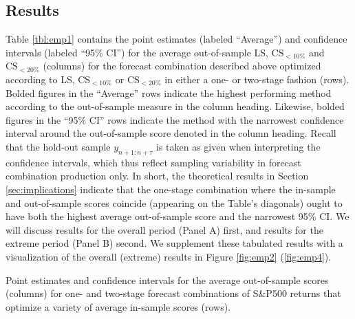 \documentclass[12pt]{article}
\theoremstyle{definition}
\theoremstyle{remark}
\begin{document}
\subsection{Results \label{subsec:empresults}}

Table \ref{tbl:emp1} contains the point estimates (labeled ``Average'') and confidence intervals (labeled ``95\% CI'') for the average out-of-sample LS, $\mathrm{CS}_{<10\%}$ and $\mathrm{CS}_{<20\%}$ (columns) for the forecast combination described above optimized according to LS, $\mathrm{CS}_{<10\%}$ or $\mathrm{CS}_{<20\%}$ in either a one- or two-stage fashion (rows). Bolded figures in the ``Average'' rows indicate the highest performing method according to the out-of-sample measure in the column heading. Likewise, bolded figures in the ``95\% CI'' rows indicate the method with the narrowest confidence interval around the out-of-sample score denoted in the column heading. Recall that the hold-out sample $y_{n+1:n+\tau }$ is taken as given when interpreting the confidence intervals, which thus reflect sampling variability in forecast combination production only. In short, the theoretical results in Section \ref{sec:implications} indicate that the one-stage combination where the in-sample and out-of-sample scores coincide (appearing on the Table's diagonals) ought to have both the highest average out-of-sample score and the narrowest 95\% CI. We will discuss results for the overall period (Panel A) first, and results for the extreme period (Panel B) second. We supplement these tabulated results with a visualization of the overall (extreme) results in Figure \ref{fig:emp2} (\ref{fig:emp4}).

\begin{table}[ht]
\centering
\resizebox{\linewidth}{!}{}
\caption{Point estimates and confidence intervals for the average out-of-sample scores (columns) for one- and two-stage forecast combinations of S\&P500 returns that optimize a variety of average in-sample scores (rows). }
\label{tbl:emp1}
\end{table}
\end{document}
